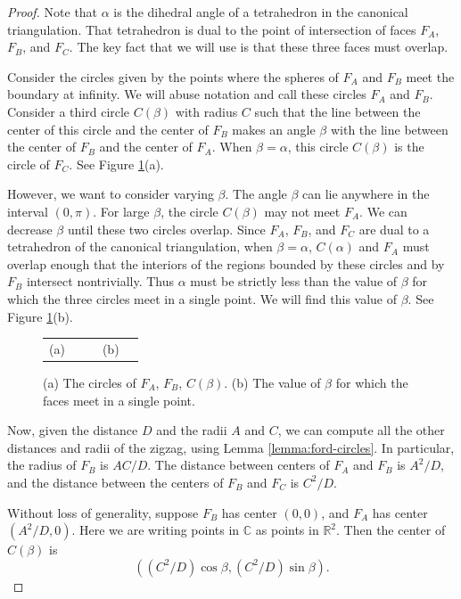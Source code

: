 \documentclass[11pt]{amsart}
\newcommand{\RR}{{\mathbb{R}}}
\newcommand{\CC}{{\mathbb{C}}}
\theoremstyle{plain}
\theoremstyle{definition}
\begin{document}
\begin{proof}
Note that $\alpha$ is the dihedral angle of a tetrahedron in the
canonical triangulation.  That tetrahedron is dual to the point of
intersection of faces $F_A$, $F_B$, and $F_C$.  The key fact that we
will use is that these three faces must overlap.

Consider the circles given by the points where the spheres of $F_A$
and $F_B$ meet the boundary at infinity.  We will abuse notation and
call these circles $F_A$ and $F_B$.  Consider a third circle
$C(\beta)$ with radius $C$ such that the line between the center of
this circle and the center of $F_B$ makes an angle $\beta$ with the
line between the center of $F_B$ and the center of $F_A$.  When
$\beta=\alpha$, this circle $C(\beta)$ is the circle of $F_C$.  See
Figure \ref{fig:circle-lemma}(a).

However, we want to consider varying $\beta$.  The angle $\beta$ can
lie anywhere in the interval $(0,\pi)$.  For large $\beta$, the
circle $C(\beta)$ may not meet $F_A$.  We can decrease $\beta$ until
these two circles overlap.  Since $F_A$, $F_B$, and $F_C$ are dual to
a tetrahedron of the canonical triangulation, when $\beta= \alpha$,
$C(\alpha)$ and $F_A$ must overlap enough that the interiors of the
regions bounded by these circles and by $F_B$ intersect nontrivially.
Thus $\alpha$ must be strictly less than the value of $\beta$ for
which the three circles meet in a single point.  We will find this
value of $\beta$.  See Figure \ref{fig:circle-lemma}(b).

\begin{figure}
\begin{tabular}{ccccc}
	(a) &
	
	& \hspace{.5in} & (b) &
	
\end{tabular}
\caption{(a) The circles of $F_A$, $F_B$, $C(\beta)$.  (b) The value of
$\beta$ for which the faces meet in a single point.}
\label{fig:circle-lemma}
\end{figure}

Now, given the distance $D$ and the radii $A$ and $C$, we can compute
all the other distances and radii of the zigzag, using Lemma
\ref{lemma:ford-circles}.  In particular, the radius of $F_B$ is
$AC/D$.  The distance between centers of $F_A$ and $F_B$ is $A^2/D$,
and the distance between the centers of $F_B$ and $F_C$ is $C^2/D$.

Without loss of generality, suppose $F_B$ has center $(0,0)$, and
$F_A$ has center $(A^2/D, 0)$. Here we are writing points in
$\CC$ as points in $\RR^2$.  Then the center of $C(\beta)$ is
$$((C^2/D)\cos{\beta}, (C^2/D)\sin{\beta}).$$


\end{proof}
\end{document}
